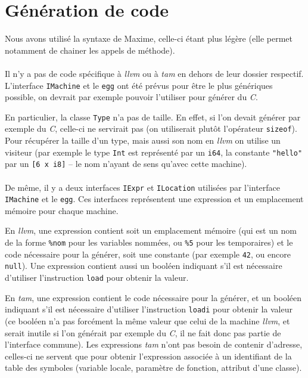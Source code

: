 \documentclass{scrartcl}
\newcommand{\egg} {\texttt{egg}}
\newcommand{\llvm}{\textit{llvm}}
\newcommand{\tam} {\textit{tam}}
\begin{document}
\section{Génération de code}
  Nous avons utilisé la syntaxe de Maxime, celle-ci étant plus légère (elle
  permet notamment de chainer les appels de méthode).

  \paragraph{}
  Il n'y a pas de code spécifique à \llvm{} ou à \tam{} en dehors de leur
  dossier respectif. L'interface \verb+IMachine+ et le \egg{} ont été prévus
  pour être le plus génériques possible, on devrait par exemple pouvoir
  l'utiliser pour générer du \textit{C}.

  En particulier, la classe \verb+Type+ n'a pas de taille. En effet, si l'on
  devait générer par exemple du \textit{C}, celle-ci ne servirait pas (on
  utiliserait plutôt l'opérateur \verb+sizeof+). Pour récupérer la taille d'un
  type, mais aussi son nom en \llvm{} on utilise un visiteur (par exemple le
  type \verb+Int+ est représenté par un \verb+i64+, la constante \verb+"hello"+
  par un \verb+[6 x i8]+ -- le nom n'ayant de sens qu'avec cette machine).

  \paragraph{}
  De même, il y a deux interfaces \verb+IExpr+ et \verb+ILocation+ utilisées
  par l'interface \verb+IMachine+ et le \egg{}. Ces interfaces représentent
  une expression et un emplacement mémoire pour chaque machine.

  En \llvm{}, une expression contient soit un emplacement mémoire (qui est un
  nom de la forme \verb+%nom+ pour les variables nommées, ou \verb+%5+ pour les
  temporaires) et le code nécessaire pour la générer, soit une constante (par
  exemple \verb+42+, ou encore \verb+null+). Une expression contient aussi un
  booléen indiquant s'il est nécessaire d'utiliser l'instruction \verb+load+
  pour obtenir la valeur.

  En \tam{}, une expression contient le code nécessaire pour la générer, et un
  booléen indiquant s'il est nécessaire d'utiliser l'instruction \verb+loadi+
  pour obtenir la valeur (ce booléen n'a pas forcément la même valeur que
  celui de la machine \llvm{}, et serait inutile si l'on générait par exemple
  du \textit{C}, il ne fait donc pas partie de l'interface commune). Les
  expressions \tam{} n'ont pas besoin de contenir d'adresse, celles-ci ne
  servent que pour obtenir l'expression associée à un identifiant de la table
  des symboles (variable locale, paramètre de fonction, attribut d'une classe).
\end{document}

